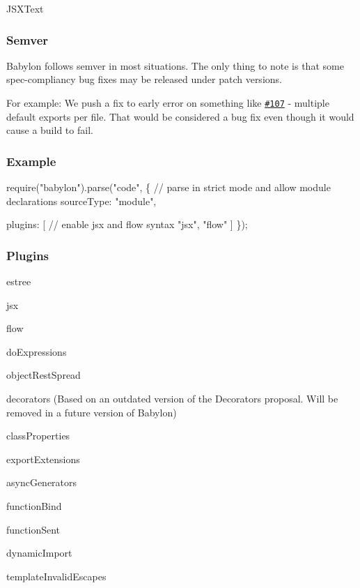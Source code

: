 \begin{DoxyItemize}
\item {\ttfamily J\+S\+X\+Text}
\end{DoxyItemize}

\subsubsection*{Semver}

Babylon follows semver in most situations. The only thing to note is that some spec-\/compliancy bug fixes may be released under patch versions.

For example\+: We push a fix to early error on something like \href{https://github.com/babel/babylon/pull/107}{\tt \#107} -\/ multiple default exports per file. That would be considered a bug fix even though it would cause a build to fail.

\subsubsection*{Example}


\begin{DoxyCode}
require("babylon").parse("code", \{
  // parse in strict mode and allow module declarations
  sourceType: "module",

  plugins: [
    // enable jsx and flow syntax
    "jsx",
    "flow"
  ]
\});
\end{DoxyCode}


\subsubsection*{Plugins}


\begin{DoxyItemize}
\item {\ttfamily estree}
\item {\ttfamily jsx}
\item {\ttfamily flow}
\item {\ttfamily do\+Expressions}
\item {\ttfamily object\+Rest\+Spread}
\item {\ttfamily decorators} (Based on an outdated version of the Decorators proposal. Will be removed in a future version of {\ttfamily Babylon})
\item {\ttfamily class\+Properties}
\item {\ttfamily export\+Extensions}
\item {\ttfamily async\+Generators}
\item {\ttfamily function\+Bind}
\item {\ttfamily function\+Sent}
\item {\ttfamily dynamic\+Import}
\item {\ttfamily template\+Invalid\+Escapes} 
\end{DoxyItemize}